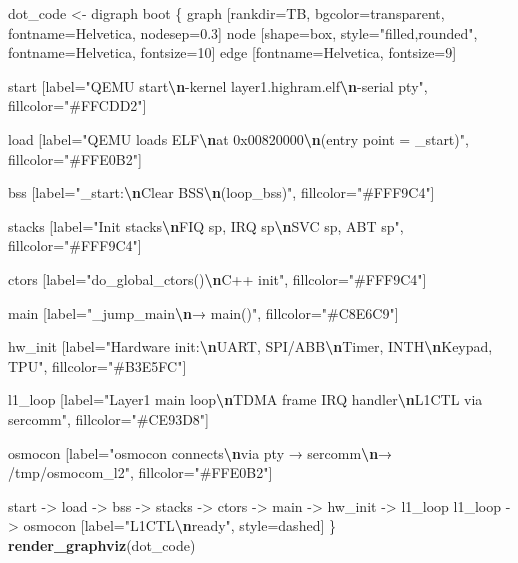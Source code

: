 \documentclass[
]{article}
\newenvironment{Shaded}{\begin{snugshade}}{\end{snugshade}}
\newcommand{\FunctionTok}[1]{\textcolor[rgb]{0.13,0.29,0.53}{\textbf{#1}}}
\newcommand{\NormalTok}[1]{#1}
\newcommand{\OtherTok}[1]{\textcolor[rgb]{0.56,0.35,0.01}{#1}}
\newcommand{\SpecialCharTok}[1]{\textcolor[rgb]{0.81,0.36,0.00}{\textbf{#1}}}
\newcommand{\StringTok}[1]{\textcolor[rgb]{0.31,0.60,0.02}{#1}}
\begin{document}
\begin{Shaded}
\begin{Highlighting}[]
\NormalTok{dot\_code }\OtherTok{\textless{}{-}} \StringTok{\textquotesingle{}digraph boot \{}
\StringTok{  graph [rankdir=TB, bgcolor=transparent, fontname=Helvetica, nodesep=0.3]}
\StringTok{  node [shape=box, style="filled,rounded", fontname=Helvetica, fontsize=10]}
\StringTok{  edge [fontname=Helvetica, fontsize=9]}

\StringTok{  start [label="QEMU start}\SpecialCharTok{\textbackslash{}n}\StringTok{{-}kernel layer1.highram.elf}\SpecialCharTok{\textbackslash{}n}\StringTok{{-}serial pty", fillcolor="\#FFCDD2"]}

\StringTok{  load [label="QEMU loads ELF}\SpecialCharTok{\textbackslash{}n}\StringTok{at 0x00820000}\SpecialCharTok{\textbackslash{}n}\StringTok{(entry point = \_start)", fillcolor="\#FFE0B2"]}

\StringTok{  bss [label="\_start:}\SpecialCharTok{\textbackslash{}n}\StringTok{Clear BSS}\SpecialCharTok{\textbackslash{}n}\StringTok{(loop\_bss)", fillcolor="\#FFF9C4"]}

\StringTok{  stacks [label="Init stacks}\SpecialCharTok{\textbackslash{}n}\StringTok{FIQ sp, IRQ sp}\SpecialCharTok{\textbackslash{}n}\StringTok{SVC sp, ABT sp", fillcolor="\#FFF9C4"]}

\StringTok{  ctors [label="do\_global\_ctors()}\SpecialCharTok{\textbackslash{}n}\StringTok{C++ init", fillcolor="\#FFF9C4"]}

\StringTok{  main [label="\_jump\_main}\SpecialCharTok{\textbackslash{}n}\StringTok{→ main()", fillcolor="\#C8E6C9"]}

\StringTok{  hw\_init [label="Hardware init:}\SpecialCharTok{\textbackslash{}n}\StringTok{UART, SPI/ABB}\SpecialCharTok{\textbackslash{}n}\StringTok{Timer, INTH}\SpecialCharTok{\textbackslash{}n}\StringTok{Keypad, TPU", fillcolor="\#B3E5FC"]}

\StringTok{  l1\_loop [label="Layer1 main loop}\SpecialCharTok{\textbackslash{}n}\StringTok{TDMA frame IRQ handler}\SpecialCharTok{\textbackslash{}n}\StringTok{L1CTL via sercomm", fillcolor="\#CE93D8"]}

\StringTok{  osmocon [label="osmocon connects}\SpecialCharTok{\textbackslash{}n}\StringTok{via pty → sercomm}\SpecialCharTok{\textbackslash{}n}\StringTok{→ /tmp/osmocom\_l2", fillcolor="\#FFE0B2"]}

\StringTok{  start {-}\textgreater{} load {-}\textgreater{} bss {-}\textgreater{} stacks {-}\textgreater{} ctors {-}\textgreater{} main {-}\textgreater{} hw\_init {-}\textgreater{} l1\_loop}
\StringTok{  l1\_loop {-}\textgreater{} osmocon [label="L1CTL}\SpecialCharTok{\textbackslash{}n}\StringTok{ready", style=dashed]}
\StringTok{\}\textquotesingle{}}
\FunctionTok{render\_graphviz}\NormalTok{(dot\_code)}
\end{Highlighting}
\end{Shaded}
\end{document}

